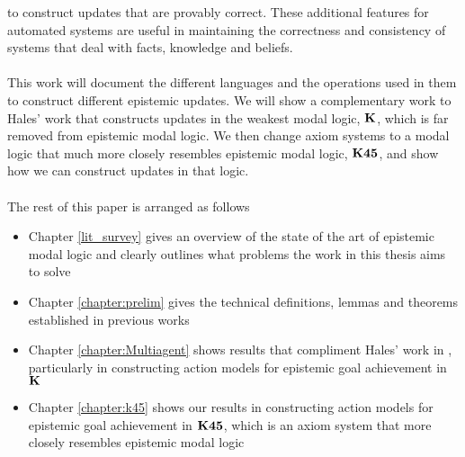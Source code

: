 to construct updates that are provably correct.
These additional features for automated systems are useful in maintaining the
correctness and consistency of systems that deal with facts, knowledge and
beliefs.\\
\\
This work will document the different languages and the operations used in them to construct
different epistemic updates.
We will show a complementary work to Hales' work that constructs updates in the weakest modal logic,
$\bf K$, which is far removed from epistemic modal logic.
We then change axiom systems to a modal logic that much more closely resembles epistemic modal
logic, $\bf K45$, and show how we can construct updates in that logic.\\
\\
The rest of this paper is arranged as follows
\begin{itemize}
	\item Chapter \ref{lit_survey} gives an overview of the state of the art of epistemic modal logic
		and clearly outlines what problems the work in this thesis aims to solve
	\item Chapter \ref{chapter:prelim} gives the technical definitions, lemmas and theorems
		established in previous works
	\item Chapter \ref{chapter:Multiagent} shows results that compliment Hales' work in
		\cite{hales13synthesis}, particularly in constructing action models for epistemic goal
		achievement in $\bf K$
	\item Chapter \ref{chapter:k45} shows our results in constructing action models for epistemic goal
		achievement in $\bf K45$, which is an axiom system that more closely resembles epistemic modal
		logic
\end{itemize}
